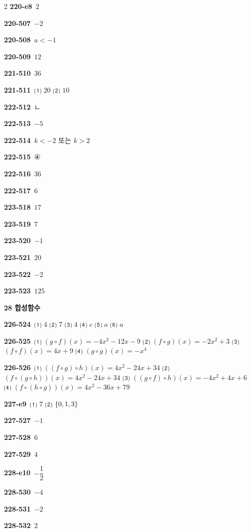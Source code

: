 \documentclass[10pt,a4paper]{article}
\begin{document}
\begin{multicols}{2}
\noindent\textbf{220-e8}\ $2$\par
\noindent\textbf{220-507}\ $-2$\par
\noindent\textbf{220-508}\ $a<-1$\par
\noindent\textbf{220-509}\ $12$\par
\noindent\textbf{221-510}\ $36$\par
\noindent\textbf{221-511}\ ⑴ $20$ ⑵ $10$\par
\noindent\textbf{222-512}\ ㄴ\par
\noindent\textbf{222-513}\ $-5$\par
\noindent\textbf{222-514}\ $k<-2$ 또는 $k>2$\par
\noindent\textbf{222-515}\ ④\par
\noindent\textbf{222-516}\ $36$\par
\noindent\textbf{222-517}\ $6$\par
\noindent\textbf{223-518}\ $17$\par
\noindent\textbf{223-519}\ $7$\par
\noindent\textbf{223-520}\ $-1$\par
\noindent\textbf{223-521}\ $20$\par
\noindent\textbf{223-522}\ $-2$\par
\noindent\textbf{223-523}\ $125$\par
\noindent\textbf{28 합성함수}\par\smallskip
\noindent\textbf{226-524}\ ⑴ $4$ ⑵ $7$ ⑶ $4$ ⑷ $c$ ⑸ $a$ ⑹ $a$\par
\noindent\textbf{226-525}\ ⑴ $(g\circ f)(x)=-4x^2-12x-9$ ⑵ $(f\circ g)(x)=-2x^2+3$ ⑶ $(f\circ f)(x)=4x+9$ ⑷ $(g\circ g)(x)=-x^4$\par
\noindent\textbf{226-526}\ ⑴ $((f\circ g)\circ h)(x)=4x^2-24x+34$ ⑵ $(f\circ(g\circ h))(x)=4x^2-24x+34$ ⑶ $((g\circ f)\circ h)(x)=-4x^2+4x+6$ ⑷ $(f\circ(h\circ g))(x)=4x^2-36x+79$\par
\noindent\textbf{227-e9}\ ⑴ $7$ ⑵ $\{0{,}\mkern3mu\mathopen{}1{,}\mkern3mu\mathopen{}3\}$\par
\noindent\textbf{227-527}\ $-1$\par
\noindent\textbf{227-528}\ $6$\par
\noindent\textbf{227-529}\ $4$\par
\noindent\textbf{228-e10}\ $-\dfrac{1}{2}$\par
\noindent\textbf{228-530}\ $-4$\par
\noindent\textbf{228-531}\ $-2$\par
\noindent\textbf{228-532}\ $2$\par

\end{multicols}
\end{document}
